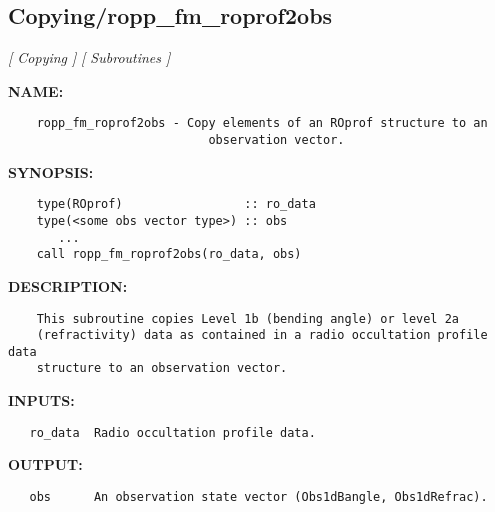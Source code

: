 \subsection{Copying/ropp\_fm\_roprof2obs}
\textsl{[ Copying ]}
\textsl{[ Subroutines ]}

\label{ch:robo30}
\label{ch:Copying_ropp_fm_roprof2obs}
\textbf{NAME:}\hspace{0.08in}\begin{Verbatim}
    ropp_fm_roprof2obs - Copy elements of an ROprof structure to an
                            observation vector.
\end{Verbatim}
\textbf{SYNOPSIS:}\hspace{0.08in}\begin{Verbatim}
    type(ROprof)                 :: ro_data
    type(<some obs vector type>) :: obs
       ...
    call ropp_fm_roprof2obs(ro_data, obs)
\end{Verbatim}
\textbf{DESCRIPTION:}\hspace{0.08in}\begin{Verbatim}
    This subroutine copies Level 1b (bending angle) or level 2a 
    (refractivity) data as contained in a radio occultation profile data
    structure to an observation vector.
\end{Verbatim}
\textbf{INPUTS:}\hspace{0.08in}\begin{Verbatim}
   ro_data  Radio occultation profile data.
\end{Verbatim}
\textbf{OUTPUT:}\hspace{0.08in}\begin{Verbatim}
   obs      An observation state vector (Obs1dBangle, Obs1dRefrac).
\end{Verbatim}
